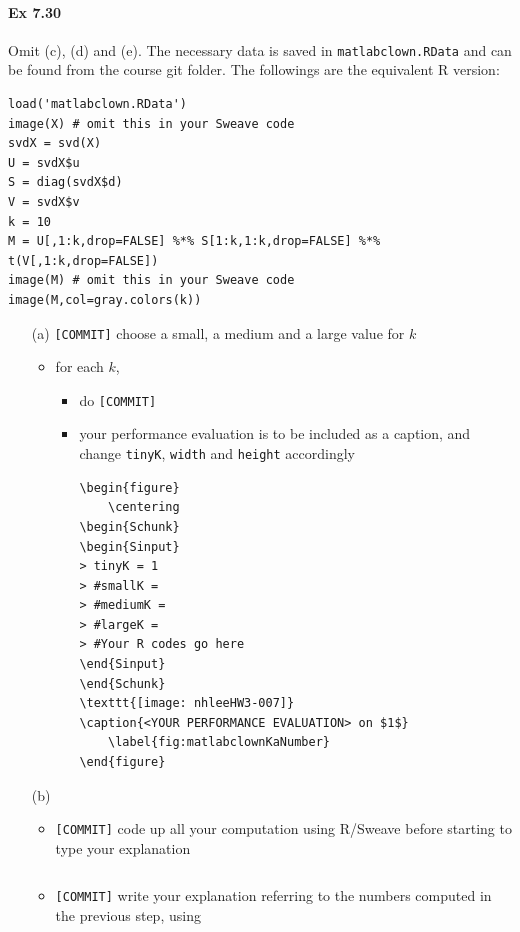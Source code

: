 \documentclass[12pt]{article}
\begin{document}
\paragraph{Ex 7.30}
Omit (c), (d) and (e). 
The necessary data is saved in \verb+matlabclown.RData+ 
and can be found from the course git folder.
The followings are the equivalent R version:
\begin{lstlisting}
load('matlabclown.RData')
image(X) # omit this in your Sweave code
svdX = svd(X)
U = svdX$u
S = diag(svdX$d)
V = svdX$v
k = 10
M = U[,1:k,drop=FALSE] %*% S[1:k,1:k,drop=FALSE] %*% t(V[,1:k,drop=FALSE])
image(M) # omit this in your Sweave code
image(M,col=gray.colors(k))
\end{lstlisting}
\begin{itemize}
    \item[(a)] \verb+[COMMIT]+ choose a small, a medium and a large value for $k$ 
         \begin{itemize}
             \item for each $k$, 
                 \begin{itemize}
             \item do \verb+[COMMIT]+ 
             \item your performance evaluation is to be included as a caption,
            and change \verb+tinyK+, \verb+width+ and \verb+height+ accordingly
\begin{lstlisting}
\begin{figure}
    \centering
\begin{Schunk}
\begin{Sinput}
> tinyK = 1
> #smallK = 
> #mediumK = 
> #largeK = 
> #Your R codes go here
\end{Sinput}
\end{Schunk}
\texttt{[image: nhleeHW3-007]}
\caption{<YOUR PERFORMANCE EVALUATION> on $1$}
    \label{fig:matlabclownKaNumber}
\end{figure}
\end{lstlisting}
                 \end{itemize}
         \end{itemize}
    \item[(b)] 
        \begin{itemize}
            \item \verb+[COMMIT]+ code up all your computation using R/Sweave
                before starting to type your explanation
\begin{lstlisting}
\end{lstlisting}
            \item \verb+[COMMIT]+ write your explanation referring to the
                numbers computed in the previous step, using
                \verb++
        \end{itemize}
\end{itemize}
\end{document}
